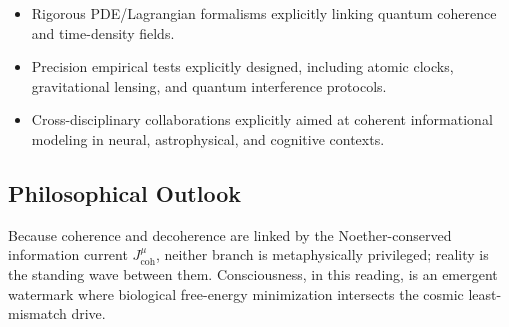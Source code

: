 \begin{itemize}
\item Rigorous PDE/Lagrangian formalisms explicitly linking quantum coherence and time-density fields.
\item Precision empirical tests explicitly designed, including atomic clocks, gravitational lensing, and quantum interference protocols.
\item Cross-disciplinary collaborations explicitly aimed at coherent informational modeling in neural, astrophysical, and cognitive contexts.
\end{itemize}

\subsection{Philosophical Outlook}

Because coherence and decoherence are linked by the Noether-conserved information current \(J_{\mathrm{coh}}^{\mu}\), neither branch is metaphysically privileged; reality is the standing wave between them.  Consciousness, in this reading, is an emergent watermark where biological free-energy minimization intersects the cosmic least-mismatch drive.

